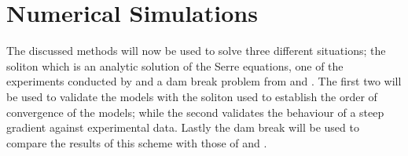 \documentclass[SingleSpace,12pt]{Serre_ASCE}
\begin{document}
\section{Numerical Simulations}
\label{section:Numerical Simulations}
The discussed methods will now be used to solve three different situations; the soliton which is an analytic solution of the Serre equations, one of the experiments conducted by  and a dam break problem from   and . The first two will be used to validate the models with the soliton used to establish the order of convergence of the models; while the second validates the behaviour of a steep gradient against experimental data. Lastly the dam break will be used to compare the results of this scheme with those of  and . 
\end{document}
